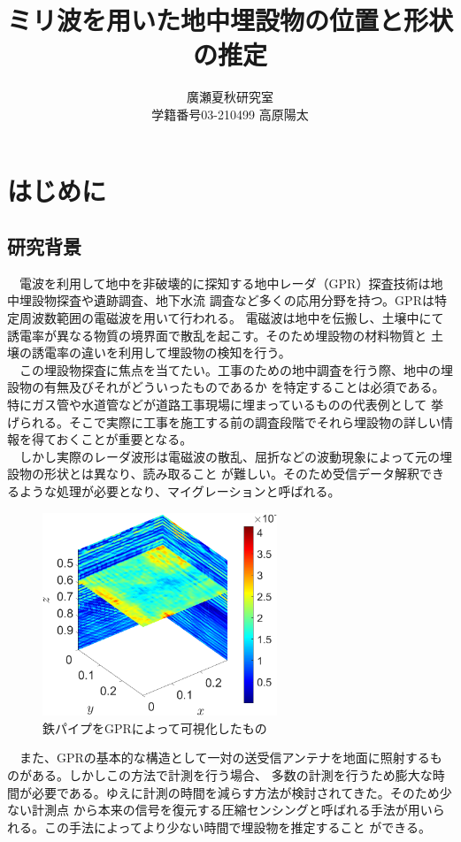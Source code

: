 \documentclass[12pt,a4paper]{jsreport}
\title{ミリ波を用いた地中埋設物の位置と形状の推定}
\author{廣瀬夏秋研究室\\
学籍番号03-210499 高原陽太}
\begin{document}
\maketitle
\tableofcontents
\clearpage
\chapter{はじめに}
\section{研究背景}
　電波を利用して地中を非破壊的に探知する地中レーダ（GPR）探査技術は地中埋設物探査や遺跡調査、地下水流
調査など多くの応用分野を持つ\cite{radar1}\cite{radar2}。GPRは特定周波数範囲の電磁波を用いて行われる。
電磁波は地中を伝搬し、土壌中にて誘電率が異なる物質の境界面で散乱を起こす。そのため埋設物の材料物質と
土壌の誘電率の違いを利用して埋設物の検知を行う。
\\　この埋設物探査に焦点を当てたい。工事のための地中調査を行う際、地中の埋設物の有無及びそれがどういったものであるか
を特定することは必須である。特にガス管や水道管などが道路工事現場に埋まっているものの代表例として
挙げられる。そこで実際に工事を施工する前の調査段階でそれら埋設物の詳しい情報を得ておくことが重要となる。
\\　しかし実際のレーダ波形は電磁波の散乱、屈折などの波動現象によって元の埋設物の形状とは異なり、読み取ること
が難しい。そのため受信データ解釈できるような処理が必要となり、マイグレーションと呼ばれる。


\begin{figure}[h]
  \begin{center}
   \includegraphics[width=7cm]{./image/0918.png}
   
  \caption{鉄パイプをGPRによって可視化したもの}\label{鉄パイプをGPRによって可視化したもの}
  \end{center}
  \end{figure}

　また、GPRの基本的な構造として一対の送受信アンテナを地面に照射するものがある。しかしこの方法で計測を行う場合、
多数の計測を行うため膨大な時間が必要である。ゆえに計測の時間を減らす方法が検討されてきた。そのため少ない計測点
から本来の信号を復元する圧縮センシングと呼ばれる手法が用いられる。この手法によってより少ない時間で埋設物を推定すること
ができる。
\end{document}
